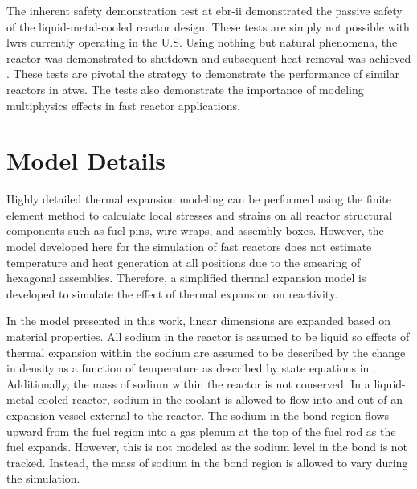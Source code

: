   The inherent safety demonstration test at \gls{ebr-ii} demonstrated the passive
  safety of the liquid-metal-cooled reactor design. These tests are simply not 
  possible with \glspl{lwr} currently operating in the U.S. 
  Using nothing but natural phenomena, the reactor was demonstrated to shutdown 
  and subsequent heat removal was achieved \cite{ebriitests}. These tests are 
  pivotal the strategy to demonstrate the performance of similar reactors in 
  \gls{atws}. The tests also demonstrate the importance of modeling multiphysics 
  effects in fast reactor applications.

\section{Model Details}
  \label{sec:model_details}
  Highly detailed thermal expansion modeling can be performed using the finite
  element method to calculate local stresses and strains on all reactor
  structural components such as fuel pins, wire wraps, and assembly boxes. 
  However, the model developed here for the simulation of
  fast reactors does not estimate temperature and heat generation at all 
  positions due to the smearing of hexagonal assemblies. Therefore, a simplified 
  thermal expansion model is developed to simulate the effect of thermal 
  expansion on reactivity.

  In the model presented in this work, linear dimensions are expanded based on 
  material properties.  All sodium in the reactor is assumed to be liquid so 
  effects of thermal expansion within the sodium are assumed to be described by 
  the change in density as a function of temperature as described by state 
  equations in \cite{sodiumProp}. Additionally, the mass of sodium within the 
  reactor is not conserved. In a liquid-metal-cooled reactor, sodium in the 
  coolant is allowed to flow into and out of an expansion vessel external to the 
  reactor.  The sodium in the bond region flows upward from the fuel region into 
  a gas plenum at the top of the fuel rod as the fuel expands. However, this is 
  not modeled as the sodium level in the bond is not tracked. Instead, the mass 
  of sodium in the bond region is allowed to vary during the simulation.


